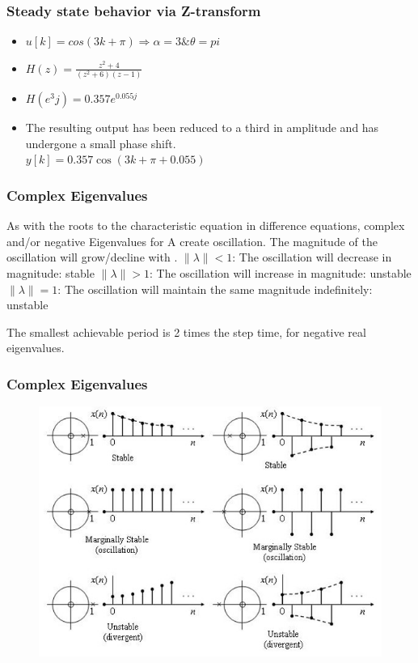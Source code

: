 \begin{frame}
	\frametitle{Steady state behavior via Z-transform}
	\begin{example}
		\begin{itemize}
			\item $u[k] = cos(3k+\pi) \Rightarrow \alpha = 3 \& \theta = pi$
			\item $H(z) = \frac{z^2+4}{(z^2+6)(z-1)}$
			\item $H(e^3j) = 0.357e^{0.055j}$
			\item The resulting output has been reduced to a third in amplitude and has undergone a small phase shift. \\
			$ y[k] =0.357 \cos(3k+\pi + 0.055)$
			
		\end{itemize}
	\end{example}
\end{frame}
\begin{frame}
	\frametitle{Complex Eigenvalues }
	As with the roots to the characteristic equation in difference equations, complex and/or negative Eigenvalues for A create oscillation.
	The magnitude of the oscillation will grow/decline with          .
	$\lVert\lambda\rVert < 1$: The oscillation will decrease in magnitude: stable
	$\lVert\lambda\rVert > 1$: The oscillation will increase in magnitude:  unstable
	$\lVert\lambda\rVert = 1$: The oscillation will maintain the same magnitude indefinitely:  unstable
	
	The smallest achievable period is 2 times the step time, for negative real eigenvalues.
	
\end{frame}
\begin{frame}
		\frametitle{Complex Eigenvalues }
		\begin{figure}
			\centering
			\includegraphics[width=0.7\linewidth]{Images/discrete_time_systems_33}
			\label{fig:discrete_time_systems_33}
		\end{figure}
\end{frame}
